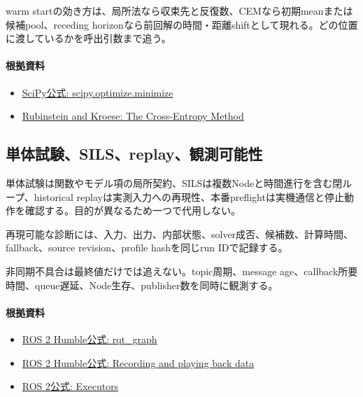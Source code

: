 \documentclass[a4paper,11pt]{article}
\begin{document}
warm startの効き方は、局所法なら収束先と反復数、CEMなら初期meanまたは候補pool、receding horizonなら前回解の時間・距離shiftとして現れる。どの位置に渡しているかを呼出引数まで追う。

\paragraph{根拠資料}
\begin{itemize}[leftmargin=1.6em]
\item \href{https://docs.scipy.org/doc/scipy/reference/generated/scipy.optimize.minimize.html}{SciPy公式: scipy.optimize.minimize}
\item \href{https://link.springer.com/book/10.1007/978-1-4757-4321-0}{Rubinstein and Kroese: The Cross-Entropy Method}
\end{itemize}

\subsection{単体試験、SILS、replay、観測可能性}
単体試験は関数やモデル項の局所契約、SILSは複数Nodeと時間進行を含む閉ループ、historical replayは実測入力への再現性、本番preflightは実機通信と停止動作を確認する。目的が異なるため一つで代用しない。


再現可能な診断には、入力、出力、内部状態、solver成否、候補数、計算時間、fallback、source revision、profile hashを同じrun IDで記録する。


非同期不具合は最終値だけでは追えない。topic周期、message age、callback所要時間、queue遅延、Node生存、publisher数を同時に観測する。

\paragraph{根拠資料}
\begin{itemize}[leftmargin=1.6em]
\item \href{https://docs.ros.org/en/ros2_packages/humble/api/rqt_graph/index.html}{ROS 2 Humble公式: rqt\_graph}
\item \href{https://docs.ros.org/en/humble/Tutorials/Beginner-CLI-Tools/Recording-And-Playing-Back-Data/Recording-And-Playing-Back-Data.html}{ROS 2 Humble公式: Recording and playing back data}
\item \href{https://docs.ros.org/en/rolling/Concepts/Intermediate/About-Executors.html}{ROS 2公式: Executors}
\end{itemize}
\end{document}
